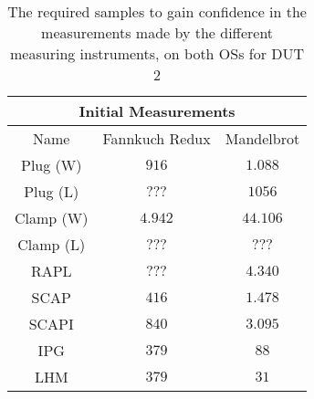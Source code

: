 \begin{table}[H]
    \centering
    \begin{tabular}{|| c | c | c ||}
    \hline
    \multicolumn{3}{||c||}{Initial Measurements} \\ [0.5ex] \hline\hline
    Name & Fannkuch Redux & Mandelbrot \\\hline
    Plug (W) & $916$ & $1.088$ \\
    Plug (L) & $???$ & $1056$ \\
    Clamp (W) & $4.942$ & $44.106$ \\
    Clamp (L) & $???$ & $???$ \\
    RAPL & $???$ & $4.340$ \\
    SCAP & $416$ & $1.478$ \\
    SCAPI & $840$ & $3.095$ \\
    IPG & $379$ & $88$ \\
    LHM & $379$ & $31$ \\\hline
    \end{tabular}
    \caption{The required samples to gain confidence in the measurements made by the different measuring instruments, on both OSs for DUT 2}
    \label{tab:initial-measurements-exp-2-dut-2}
\end{table}